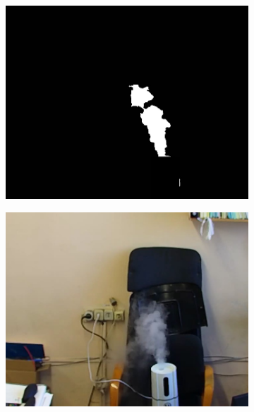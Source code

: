 \documentclass[t]{beamer}
\begin{document}
\begin{frame}[noframenumbering]
\begin{figure}[h!]
		\begin{subfigure}{.30\textwidth}
			\centering
			\includegraphics[width = \textwidth]{image/chapter_3/examples/mask/159}
		\end{subfigure}
		\begin{subfigure}{.30\textwidth}
			\centering
			\includegraphics[width = \textwidth]{image/chapter_3/examples/img/214}
			\caption{}
		\end{subfigure}
		\begin{subfigure}{.30\textwidth}
			\centering

\end{subfigure}
\end{figure}
\end{frame}
\end{document}
